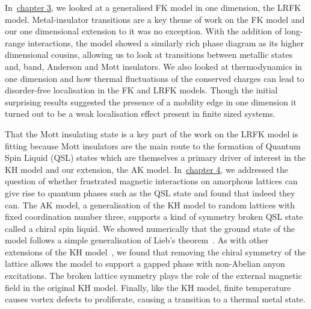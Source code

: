 In~\protect\hyperlink{chap:3-the-long-range-falicov-kimball-model}{chapter 3}, we looked at a generalised FK model in one dimension, the LRFK model. Metal-insulator transitions are a key theme of work on the FK model and our one dimensional extension to it was no exception. With the addition of long-range interactions, the model showed a similarly rich phase diagram as its higher dimensional cousins, allowing us to look at transitions between metallic states and, band, Anderson and Mott insulators. We also looked at thermodynamics in one dimension and how thermal fluctuations of the conserved charges can lead to disorder-free localisation in the FK and LRFK models. Though the initial surprising results suggested the presence of a mobility edge in one dimension it turned out to be a weak localisation effect present in finite sized systems.

That the Mott insulating state is a key part of the work on the LRFK model is fitting because Mott insulators are the main route to the formation of Quantum Spin Liquid (QSL) states which are themselves a primary driver of interest in the KH model and our extension, the AK model. In~\protect\hyperlink{chap:4-the-amorphous-kitaev-model}{chapter 4}, we addressed the question of whether frustrated magnetic interactions on amorphous lattices can give rise to quantum phases such as the QSL state and found that indeed they can. The AK model, a generalisation of the KH model to random lattices with fixed coordination number three, supports a kind of symmetry broken QSL state called a chiral spin liquid. We showed numerically that the ground state of the model follows a simple generalisation of Lieb's theorem~\autocite{lieb_flux_1994,OBrienPRB2016,eschmannThermodynamicClassificationThreedimensional2020}. As with other extensions of the KH model~\autocite{yaoExactChiralSpin2007}, we found that removing the chiral symmetry of the lattice allows the model to support a gapped phase with non-Abelian anyon excitations. The broken lattice symmetry plays the role of the external magnetic field in the original KH model. Finally, like the KH model, finite temperature causes vortex defects to proliferate, causing a transition to a thermal metal state.

